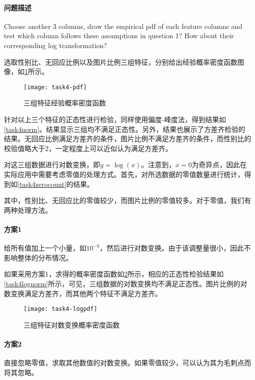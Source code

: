 \documentclass[a4paper,12pt]{article}
\begin{document}
    \paragraph{问题描述} Choose another 3 columns, draw the empirical pdf of each feature columns and test which column follows these assumptions in question 1? How about their corresponding log transformation?

    选取性别比、无回应比例以及图片比例三组特征，分别给出经验概率密度函数图像，如\cref{fig:gnn}所示。

    \begin{figure}[htbp]
        \centering
        \texttt{[image: task4-pdf]}
        \caption{三组特征经验概率密度函数}
        \label{fig:gnn}
    \end{figure}

    针对以上三个特征的正态性进行检验，同样使用偏度-峰度法，得到结果如\cref{task4norm}。结果显示三组均不满足正态性。另外，结果也展示了方差齐检验的结果。无回应比例满足方差齐的条件，图片比例不满足方差齐的条件，而性别比的校验值略大于2，一定程度上可以近似认为满足方差齐。
    

    对这三组数据进行对数变换，即$y=\log(x)$。注意到，$x=0$为奇异点，因此在实际应用中需要考虑零值的处理方式。首先，对所选数据的零值数量进行统计，得到如\cref{task4zerocount}的结果。
    
    其中，性别比、无回应比的零值较少，而图片比例的零值较多。对于零值，我们有两种处理方法。
    \paragraph{方案1} 给所有值加上一个小量，如$10^{-6}$，然后进行对数变换。由于该调整量很小，因此不影响整体的分布情况。

    如果采用方案1，求得的概率密度函数如\cref{fig:task4loggnn}所示，相应的正态性检验结果如\cref{task4lognorm}所示，可见，三组数据的对数变换均不满足正态性。图片比例的对数变换满足方差齐，而其他两个特征不满足方差齐。

    \begin{figure}
      \centering
      \texttt{[image: task4-logpdf]}
      \caption{三组特征对数变换概率密度函数}
      \label{fig:task4loggnn}
    \end{figure}

    
    \paragraph{方案2} 直接忽略零值，求取其他数值的对数变换。如果零值较少，可以认为其为毛刺点而将其忽略。
\end{document}

